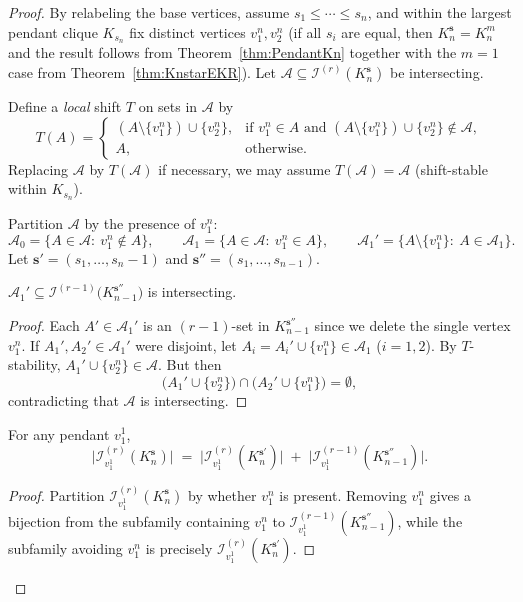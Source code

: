 \documentclass[10pt,a4paper]{amsart}
\newcommand{\A}{\mathcal{A}}
\newcommand{\s}{\mathbf{s}}
\begin{document}
\begin{proof}
By relabeling the base vertices, assume $s_1\le \cdots \le s_n$, and within the largest pendant clique $K_{s_n}$ fix distinct vertices $v_1^n,v_2^n$ (if all $s_i$ are equal, then $K_n^{\s}=K_n^m$ and the result follows from Theorem~\ref{thm:PendantKn} together with the $m=1$ case from Theorem~\ref{thm:KnstarEKR}). Let $\A\subseteq \mathcal{I}^{(r)}(K_n^{\s})$ be intersecting.



Define a \emph{local} shift $T$ on sets in $\A$ by
\[
T(A)=
\begin{cases}
(A\setminus\{v_1^n\})\cup\{v_2^n\}, &\text{if } v_1^n\in A \text{ and } (A\setminus\{v_1^n\})\cup\{v_2^n\}\notin \A,\\
A,&\text{otherwise}.
\end{cases}
\]
Replacing $\A$ by $T(\A)$ if necessary, we may assume $T(\A)=\A$ (shift-stable within $K_{s_n}$).

Partition $\A$ by the presence of $v_1^n$:
\[
\A_0=\{A\in\A:\ v_1^n\notin A\},\qquad
\A_1=\{A\in\A:\ v_1^n\in A\},\qquad
\A_1'=\{A\setminus\{v_1^n\}:\ A\in\A_1\}.
\]
Let $\s'=(s_1,\dots,s_n-1)$ and $\s''=(s_1,\dots,s_{n-1})$.


\bigskip

\begin{claim}\label{claim:intersectingA1prime}
$\A_1'\subseteq \mathcal{I}^{(r-1)}\!\bigl(K_{n-1}^{\s''}\bigr)$ is intersecting.
\end{claim}
\begin{proof}
Each $A'\in \A_1'$ is an $(r-1)$-set in $K_{n-1}^{\s''}$ since we delete the single vertex $v_1^n$. 
If $A_1',A_2'\in \A_1'$ were disjoint, let $A_i=A_i'\cup\{v_1^n\}\in\A_1$ ($i=1,2$). By $T$-stability, $A_1' \cup\{v_2^n\}\in\A$. But then 
\[
\bigl(A_1'\cup\{v_2^n\}\bigr)\cap \bigl(A_2'\cup\{v_1^n\}\bigr)=\emptyset,
\]
contradicting that $\A$ is intersecting.
\end{proof}


\bigskip

\begin{claim}\label{claim:counting-star-s}
For any pendant $v_1^1$,
\[
\bigl|\mathcal{I}^{(r)}_{v_1^1}(K_n^{\s})\bigr|
\;=\;
\bigl|\mathcal{I}^{(r)}_{v_1^1}(K_n^{\s'} )\bigr|
\;+\;
\bigl|\mathcal{I}^{(r-1)}_{v_1^1}(K_{n-1}^{\s''})\bigr|.
\]
\end{claim}
\begin{proof}
Partition $\mathcal{I}^{(r)}_{v_1^1}(K_n^{\s})$ by whether $v_1^n$ is present. Removing $v_1^n$ gives a bijection from the subfamily containing $v_1^n$ to $\mathcal{I}^{(r-1)}_{v_1^1}(K_{n-1}^{\s''})$, while the subfamily avoiding $v_1^n$ is precisely $\mathcal{I}^{(r)}_{v_1^1}(K_n^{\s'})$.
\end{proof}


\end{proof}
\end{document}
